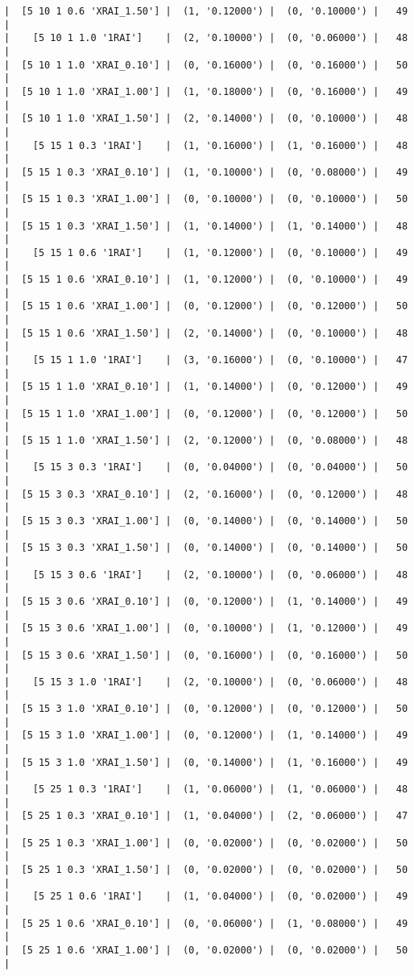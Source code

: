 \documentclass{article}
\begin{document}
\begin{verbatim}
|  [5 10 1 0.6 'XRAI_1.50'] |  (1, '0.12000') |  (0, '0.10000') |   49  |
|    [5 10 1 1.0 '1RAI']    |  (2, '0.10000') |  (0, '0.06000') |   48  |
|  [5 10 1 1.0 'XRAI_0.10'] |  (0, '0.16000') |  (0, '0.16000') |   50  |
|  [5 10 1 1.0 'XRAI_1.00'] |  (1, '0.18000') |  (0, '0.16000') |   49  |
|  [5 10 1 1.0 'XRAI_1.50'] |  (2, '0.14000') |  (0, '0.10000') |   48  |
|    [5 15 1 0.3 '1RAI']    |  (1, '0.16000') |  (1, '0.16000') |   48  |
|  [5 15 1 0.3 'XRAI_0.10'] |  (1, '0.10000') |  (0, '0.08000') |   49  |
|  [5 15 1 0.3 'XRAI_1.00'] |  (0, '0.10000') |  (0, '0.10000') |   50  |
|  [5 15 1 0.3 'XRAI_1.50'] |  (1, '0.14000') |  (1, '0.14000') |   48  |
|    [5 15 1 0.6 '1RAI']    |  (1, '0.12000') |  (0, '0.10000') |   49  |
|  [5 15 1 0.6 'XRAI_0.10'] |  (1, '0.12000') |  (0, '0.10000') |   49  |
|  [5 15 1 0.6 'XRAI_1.00'] |  (0, '0.12000') |  (0, '0.12000') |   50  |
|  [5 15 1 0.6 'XRAI_1.50'] |  (2, '0.14000') |  (0, '0.10000') |   48  |
|    [5 15 1 1.0 '1RAI']    |  (3, '0.16000') |  (0, '0.10000') |   47  |
|  [5 15 1 1.0 'XRAI_0.10'] |  (1, '0.14000') |  (0, '0.12000') |   49  |
|  [5 15 1 1.0 'XRAI_1.00'] |  (0, '0.12000') |  (0, '0.12000') |   50  |
|  [5 15 1 1.0 'XRAI_1.50'] |  (2, '0.12000') |  (0, '0.08000') |   48  |
|    [5 15 3 0.3 '1RAI']    |  (0, '0.04000') |  (0, '0.04000') |   50  |
|  [5 15 3 0.3 'XRAI_0.10'] |  (2, '0.16000') |  (0, '0.12000') |   48  |
|  [5 15 3 0.3 'XRAI_1.00'] |  (0, '0.14000') |  (0, '0.14000') |   50  |
|  [5 15 3 0.3 'XRAI_1.50'] |  (0, '0.14000') |  (0, '0.14000') |   50  |
|    [5 15 3 0.6 '1RAI']    |  (2, '0.10000') |  (0, '0.06000') |   48  |
|  [5 15 3 0.6 'XRAI_0.10'] |  (0, '0.12000') |  (1, '0.14000') |   49  |
|  [5 15 3 0.6 'XRAI_1.00'] |  (0, '0.10000') |  (1, '0.12000') |   49  |
|  [5 15 3 0.6 'XRAI_1.50'] |  (0, '0.16000') |  (0, '0.16000') |   50  |
|    [5 15 3 1.0 '1RAI']    |  (2, '0.10000') |  (0, '0.06000') |   48  |
|  [5 15 3 1.0 'XRAI_0.10'] |  (0, '0.12000') |  (0, '0.12000') |   50  |
|  [5 15 3 1.0 'XRAI_1.00'] |  (0, '0.12000') |  (1, '0.14000') |   49  |
|  [5 15 3 1.0 'XRAI_1.50'] |  (0, '0.14000') |  (1, '0.16000') |   49  |
|    [5 25 1 0.3 '1RAI']    |  (1, '0.06000') |  (1, '0.06000') |   48  |
|  [5 25 1 0.3 'XRAI_0.10'] |  (1, '0.04000') |  (2, '0.06000') |   47  |
|  [5 25 1 0.3 'XRAI_1.00'] |  (0, '0.02000') |  (0, '0.02000') |   50  |
|  [5 25 1 0.3 'XRAI_1.50'] |  (0, '0.02000') |  (0, '0.02000') |   50  |
|    [5 25 1 0.6 '1RAI']    |  (1, '0.04000') |  (0, '0.02000') |   49  |
|  [5 25 1 0.6 'XRAI_0.10'] |  (0, '0.06000') |  (1, '0.08000') |   49  |
|  [5 25 1 0.6 'XRAI_1.00'] |  (0, '0.02000') |  (0, '0.02000') |   50  |

\end{verbatim}
\end{document}
